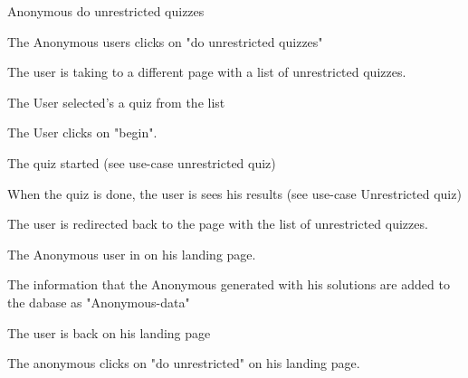 \begin{uc}{Anonymous do unrestricted quizzes}

    \begin{uc-mss}
    	\item The Anonymous users clicks on "do unrestricted quizzes"
    	\item The user is taking to a different page with a list of unrestricted quizzes.
    	\item The User selected's a quiz from the list
    	\item The User clicks on "begin".
    	\item The quiz started (see use-case unrestricted quiz)
    	\item When the quiz is done, the user is sees his results (see use-case Unrestricted quiz)
    	\item The user is redirected back to the page with the list of unrestricted quizzes.
    \end{uc-mss}

    \begin{uc-pre}
        \item The Anonymous user in on his landing page.
    \end{uc-pre}

    \begin{uc-post}
        \item The information that the Anonymous generated with his solutions are added to the dabase as "Anonymous-data"
        \item The user is back on his landing page
    \end{uc-post}

    \begin{uc-trig}
        The anonymous clicks on "do unrestricted" on his landing page.
    \end{uc-trig}

\end{uc}
